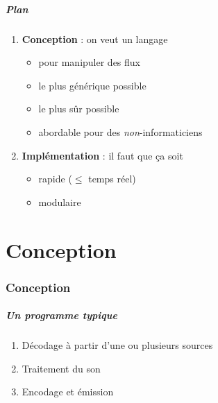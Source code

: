 \documentclass{beamer}
\newcommand{\partie}[1]{\part{#1}\section{#1}\frame{\partpage}}
\begin{document}
\begin{frame}
  \frametitle{Plan}

  \begin{enumerate}
  \item \textbf{Conception} : on veut un langage
    \begin{itemize}
    \item pour manipuler des flux %
    \item le plus générique possible %
    \item le plus sûr possible %
    \item abordable pour des \emph{non}-informaticiens %
    \end{itemize}
  \item<2-> \textbf{Implémentation} : il faut que ça soit
    \begin{itemize}
    \item rapide ($\leq$ temps réel)
    \item modulaire
    \end{itemize}
  \end{enumerate}
\end{frame}

\partie{Conception}

\begin{frame}
  \frametitle{Un programme typique}

  \begin{enumerate}
  \item Décodage à partir d'une ou plusieurs sources
  \item Traitement du son
  \item Encodage et émission
  \end{enumerate}
\end{frame}
\end{document}
